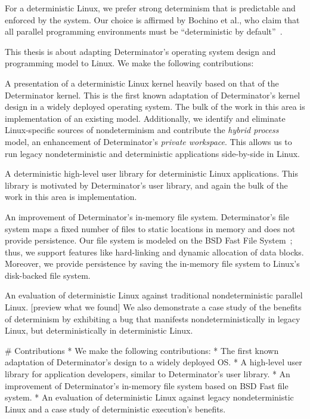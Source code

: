 For a deterministic Linux, we prefer strong determinism
that is predictable and enforced by the system. Our choice is
affirmed by Bochino et al., who claim that all parallel programming environments
must be ``deterministic by default''~\cite{bocchino2009parallel}.

This thesis is about adapting Determinator's operating system design and
programming model to Linux. We make the following contributions:
\begin{myitemize4}
    \item A presentation of a deterministic Linux kernel heavily based on that
    of the Determinator kernel. This is the first known adaptation of
    Determinator's kernel design in a widely deployed operating system.
    The bulk of the work in this area is implementation of an existing model.
    Additionally, we identify and eliminate Linux-specific sources of
    nondeterminism and contribute the \emph{hybrid process} model, an
    enhancement of Determinator's \emph{private workspace}. This allows
    us to run legacy nondeterministic and deterministic applications
    side-by-side in Linux.
    \item A deterministic high-level user library for deterministic Linux
    applications. This library is motivated by Determinator's user library, and
    again the bulk of the work in this area is implementation.
    \item An improvement of Determinator's in-memory file system.
    Determinator's file system maps a fixed number of files to static locations
    in memory and does not provide persistence. Our file system is modeled on
    the BSD Fast File System~\cite{mckusick1984fast}; thus, we support features
    like hard-linking and dynamic allocation of data blocks. Moreover, we
    provide persistence by saving the in-memory file system to Linux's
    disk-backed file system.
    \item An evaluation of deterministic Linux against traditional
    nondeterministic parallel Linux. [preview what we found] We also demonstrate
    a case study of the benefits of determinism by exhibiting a bug that
    manifests nondeterministically in legacy Linux, but deterministically in
    deterministic Linux.
\end{myitemize4}

\iffalse

# Contributions
* We make the following contributions:
* The first known adaptation of Determinator's design to a widely deployed OS.
* A high-level user library for application developers, similar to
  Determinator's user library.
* An improvement of Determinator's in-memory file system based on BSD Fast
  file system.
* An evaluation of deterministic Linux against legacy nondeterministic Linux and
  a case study of deterministic execution's benefits.

